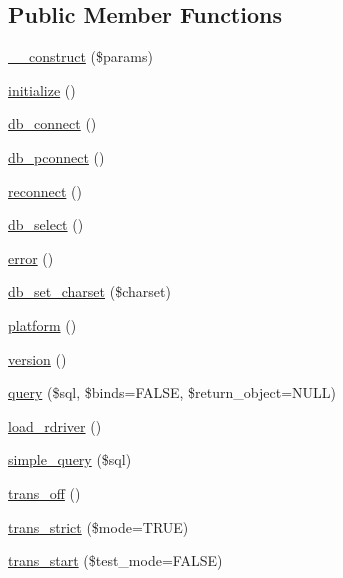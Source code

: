 \subsection*{Public Member Functions}
\begin{DoxyCompactItemize}
\item 
\mbox{\hyperlink{class_c_i___d_b__driver_a4d58a9fa25ca47ad6e38822df3d1aa33}{\+\_\+\+\_\+construct}} (\$params)
\item 
\mbox{\hyperlink{class_c_i___d_b__driver_aa04f555c219b29ce8519eeb0e4e8446c}{initialize}} ()
\item 
\mbox{\hyperlink{class_c_i___d_b__driver_adbc1be97e40e42af0f18c0474dc8d50b}{db\+\_\+connect}} ()
\item 
\mbox{\hyperlink{class_c_i___d_b__driver_a386d514dfbd21d07e2613ef6cfdbb912}{db\+\_\+pconnect}} ()
\item 
\mbox{\hyperlink{class_c_i___d_b__driver_a7406e9f1fd0e67af8f5d7eb982577543}{reconnect}} ()
\item 
\mbox{\hyperlink{class_c_i___d_b__driver_af2b43875faa68762b65b6e5f84f45d19}{db\+\_\+select}} ()
\item 
\mbox{\hyperlink{class_c_i___d_b__driver_af957efc0046c214f6fa9b3b80115991e}{error}} ()
\item 
\mbox{\hyperlink{class_c_i___d_b__driver_ad0748b50ca688b84f2b8404bec53965a}{db\+\_\+set\+\_\+charset}} (\$charset)
\item 
\mbox{\hyperlink{class_c_i___d_b__driver_a69dc8f4ac40d5bb9f32923b5669196cf}{platform}} ()
\item 
\mbox{\hyperlink{class_c_i___d_b__driver_a007438cd21e589d5ba41f251a6cc95c0}{version}} ()
\item 
\mbox{\hyperlink{class_c_i___d_b__driver_a0dec9a2b1896d1833e3d3698b519a9d0}{query}} (\$sql, \$binds=F\+A\+L\+SE, \$return\+\_\+object=N\+U\+LL)
\item 
\mbox{\hyperlink{class_c_i___d_b__driver_a1f43155b04b80773640ffb60dd6e0258}{load\+\_\+rdriver}} ()
\item 
\mbox{\hyperlink{class_c_i___d_b__driver_a64182067959e1024bc1fcb66cec7d10f}{simple\+\_\+query}} (\$sql)
\item 
\mbox{\hyperlink{class_c_i___d_b__driver_ab5b1f3fec061ad1272f0003cdefbb465}{trans\+\_\+off}} ()
\item 
\mbox{\hyperlink{class_c_i___d_b__driver_ad1b732841acb3fc91888b7f7a39adb5f}{trans\+\_\+strict}} (\$mode=T\+R\+UE)
\item 
\mbox{\hyperlink{class_c_i___d_b__driver_ac3a876e1eba59bb5e7f3dc0f7190fd8f}{trans\+\_\+start}} (\$test\+\_\+mode=F\+A\+L\+SE)

\end{DoxyCompactItemize}
